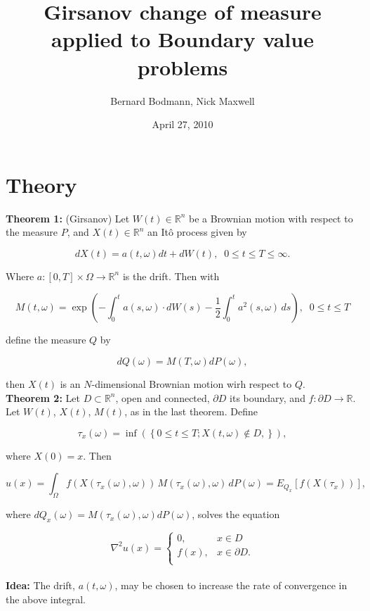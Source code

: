 \documentclass[12pt]{article}
\title{Girsanov change of measure applied to Boundary value problems}
\date{April 27, 2010}
\author{Bernard Bodmann, Nick Maxwell}
\newcommand{\reals}[0] { \mathbb{R}}
\newcommand{\om}[0] { \omega }
\newcommand{\Om}[0] { \Omega }
\newcommand{\rarw}[0] { \rightarrow }
\begin{document}
\maketitle

\section*{Theory}

{\bf Theorem 1:} (Girsanov) Let $W(t) \in \reals^n$ be a Brownian motion with respect to the measure $P$,  and $X(t) \in \reals^n$ an It\^o process given by 

$$
dX(t) = a(t,\om) dt + dW(t), \; \; 0 \le t \le T \le \infty.
$$

\noindent
Where $a:[0,T] \times \Om \rarw \reals^n$ is the drift. Then with

$$
M(t, \om ) = \exp \left( - \int_0^t a(s,\om) \cdot dW(s) - \frac{1}{2} \int_0^t a^2(s,\om) \, ds  \right), \; \; 0 \le t \le T
$$

\noindent
define the measure $Q$ by 

$$
dQ(\om) = M(T, \om) dP(\om),
$$

\noindent
then $X(t)$ is an $N$-dimensional Brownian motion wirh respect to $Q$. \\



{\bf Theorem 2:} Let $D \subset \reals^n$, open and connected, $\partial D$ its boundary, and $f: \partial D \rarw \reals$. Let $W(t)$, $X(t)$, $M(t)$, as in the last theorem. Define

$$
\tau_{x}(\om) = \inf \left( \left\{  0 \le t \le T;  X(t, \om) \not \in D,  \right\} \right),
$$

\noindent
where $X(0) = x$. Then

$$
u(x) = \int_\Om f ( X(\tau_x(\om), \om) ) \, M(\tau_x(\om), \om) \,  dP(\om) = E_{Q_x} [ f(X(\tau_x)) ],
$$

\noindent
where $dQ_x(\om) = M(\tau_x(\om), \om) dP(\om)$, solves the equation 

$$
\nabla^2 u(x) = \left \{ \begin{array}{cc} 
0, & x \in D \\
f(x), & x \in \partial D. \\
\end{array} \right.
$$\\

{\bf Idea:}
The drift, $a(t,\om)$, may be chosen to increase the rate of convergence in the above integral.
\end{document}
